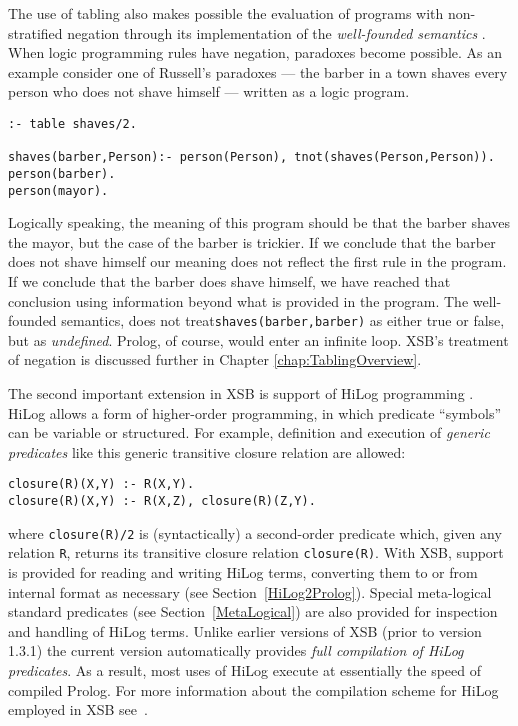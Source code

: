 \begin{example} \label{ex:Russell}
The use of tabling also makes possible the evaluation of programs with
non-stratified negation through its implementation of the {\em
well-founded semantics} \cite{VGRS91}.  When logic programming rules
have negation, paradoxes become possible.  As an example consider one
of Russell's paradoxes --- 
the barber in a town shaves every person who does not shave himself ---
written as a logic program.
\begin{center}
\begin{verbatim} 
:- table shaves/2.

shaves(barber,Person):- person(Person), tnot(shaves(Person,Person)).
person(barber).
person(mayor).
\end{verbatim} 
\end{center}
Logically speaking, the meaning of this program should be that the
barber shaves 
the mayor, but the case of the barber is trickier.  If we conclude
that the barber does not shave himself our meaning does not reflect the 
first rule in the program.  If we conclude that the barber does shave
himself, we have reached that conclusion using information beyond what 
is provided in the program.  The well-founded semantics, does not
treat{\tt shaves(barber,barber)} as either true or false, but as {\em
undefined}. 
Prolog, of course, would enter an infinite loop.  XSB's treatment of
negation is discussed further in Chapter \ref{chap:TablingOverview}.
\end{example}

The second important extension in XSB is support of HiLog
programming \cite{ChKW93,SaWa95}.  HiLog allows a form of 
higher-order programming, in
which predicate ``symbols'' can be variable or structured.  For example,
definition and execution of {\em generic predicates} like this generic
transitive closure relation are allowed:
\begin{center}
\begin{minipage}{3.7in}
\begin{verbatim}
closure(R)(X,Y) :- R(X,Y).
closure(R)(X,Y) :- R(X,Z), closure(R)(Z,Y).
\end{verbatim}
\end{minipage}
\end{center}
where {\tt closure(R)/2} is (syntactically) a second-order predicate
which, given any relation {\tt R}, returns its transitive closure
relation {\tt closure(R)}.  With XSB, support is provided for reading and
writing HiLog terms, converting them to or from internal format as
necessary (see Section~\ref{HiLog2Prolog}).  Special meta-logical
standard predicates (see Section~\ref{MetaLogical}) are also provided
for inspection and handling of HiLog terms.  Unlike earlier versions
of XSB (prior to version 1.3.1) the current version automatically
provides {\em full compilation of HiLog predicates}.  As a result,
most uses of HiLog execute at essentially the speed of compiled
Prolog.  For more information about the compilation scheme for HiLog
employed in XSB see~\cite{SaWa95}.

